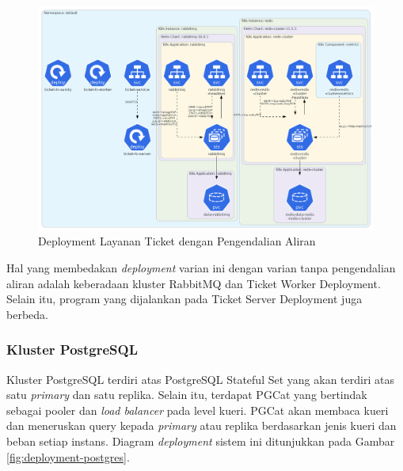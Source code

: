 \begin{figure}[H]
    \centering
    \includegraphics[width=1\textwidth]{resources/chapter-4/ticket-fc.png}
    \caption{Deployment Layanan Ticket dengan Pengendalian Aliran}
    \label{fig:deployment-ticket-fc}
\end{figure}

Hal yang membedakan \textit{deployment} varian ini dengan varian tanpa pengendalian aliran adalah keberadaan kluster RabbitMQ dan Ticket Worker Deployment. Selain itu, program yang dijalankan pada Ticket Server Deployment juga berbeda.

\pagebreak

\subsubsection{Kluster PostgreSQL}

Kluster PostgreSQL terdiri atas PostgreSQL Stateful Set yang akan terdiri atas satu \textit{primary} dan satu replika. Selain itu, terdapat PGCat yang bertindak sebagai pooler dan \textit{load balancer} pada level kueri. PGCat akan membaca kueri dan meneruskan query kepada \textit{primary} atau replika berdasarkan jenis kueri dan beban setiap instans. Diagram \textit{deployment} sistem ini ditunjukkan pada Gambar \ref{fig:deployment-postgres}.

